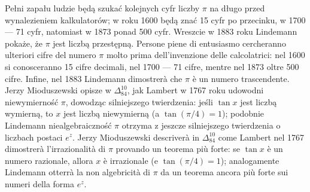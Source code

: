 Pełni zapału ludzie będą szukać kolejnych cyfr liczby $\pi$ na długo przed wynalezieniem kalkulatorów; w roku 1600 będą znać 15 cyfr po przecinku, w 1700 --- 71 cyfr, natomiast w 1873 ponad 500 cyfr. %
Wreszcie w 1883 roku Lindemann pokaże, że $\pi$ jest liczbą przestępną. %
Persone piene di entusiasmo cercheranno ulteriori cifre del numero $\pi$ molto prima dell’invenzione delle calcolatrici: nel 1600 si conosceranno 15 cifre decimali, nel 1700 --- 71 cifre, mentre nel 1873 oltre 500 cifre. %
Infine, nel 1883 Lindemann dimostrerà che $\pi$ è un numero trascendente. %
Jerzy Mioduszewski opisze w $\Delta_{84}^{10}$, jak Lambert w 1767 roku udowodni niewymierność $\pi$, dowodząc silniejszego twierdzenia: jeśli $\tan x$ jest liczbą wymierną, to $x$ jest liczbą niewymierną (a $\tan (\pi/4) = 1$); podobnie Lindemann niealgebraiczność $\pi$ otrzyma z jeszcze silniejszego twierdzenia o liczbach postaci $e^z$. %
Jerzy Mioduszewski descriverà in $\Delta_{84}^{10}$ come Lambert nel 1767 dimostrerà l'irrazionalità di $\pi$ provando un teorema più forte: se $\tan x$ è un numero razionale, allora $x$ è irrazionale (e $\tan (\pi/4) = 1$); analogamente Lindemann otterrà la non algebricità di $\pi$ da un teorema ancora più forte sui numeri della forma $e^z$. %


%